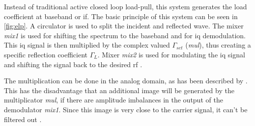 \documentclass[12pt,a4paper,parskip=full,abstract=true,BCOR=10mm,twoside,open=right]{scrreprt}
\begin{document}
Instead of traditional active closed loop load-pull, this system generates the
load coefficient at baseband or \gls{if}. The basic principle of this system
can be seen in \cref{fig:elp}. A circulator is used to split the incident and
reflected wave. The mixer \textit{mix1} is used for shifting the spectrum to
the baseband and for \gls{iq} demodulation. This \gls{iq} signal is then
multiplied by the complex valued $\Gamma_{set}$ (\textit{mul}), thus creating a specific
reflection coefficient $\Gamma_L$. Mixer \textit{mix2} is used for modulating
the \gls{iq} signal and shifting the signal back to the desired \gls{rf} \cite{williams_experimental_2005}.

The multiplication can be done in the analog domain, as has been described
by \cite{williams_experimental_2005}. This has the disadvantage that
an additional image will be generated by the multiplicator \textit{mul},
if there are amplitude imbalances in the output
of the demodulator \textit{mix1}. Since this image is very close to the
carrier signal, it can't be filtered out \cite{hashmi_agile_2010}.
\end{document}
